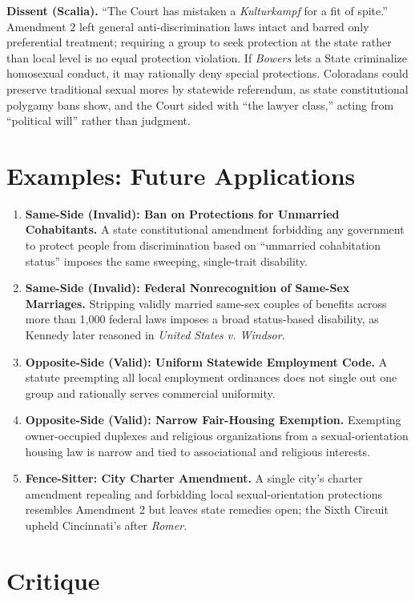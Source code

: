 \documentclass[12pt]{article}
\begin{document}
\textbf{Dissent (Scalia).} ``The Court has mistaken a \textit{Kulturkampf} for a fit of spite.'' Amendment 2 left general anti-discrimination laws intact and barred only preferential treatment; requiring a group to seek protection at the state rather than local level is no equal protection violation. If \textit{Bowers} lets a State criminalize homosexual conduct, it may rationally deny special protections. Coloradans could preserve traditional sexual mores by statewide referendum, as state constitutional polygamy bans show, and the Court sided with ``the lawyer class,'' acting from ``political will'' rather than judgment.

\section{Examples: Future Applications}

\begin{enumerate}
\item \textbf{Same-Side (Invalid): Ban on Protections for Unmarried Cohabitants.} A state constitutional amendment forbidding any government to protect people from discrimination based on ``unmarried cohabitation status'' imposes the same sweeping, single-trait disability.
\item \textbf{Same-Side (Invalid): Federal Nonrecognition of Same-Sex Marriages.} Stripping validly married same-sex couples of benefits across more than 1,000 federal laws imposes a broad status-based disability, as Kennedy later reasoned in \textit{United States v. Windsor}.
\item \textbf{Opposite-Side (Valid): Uniform Statewide Employment Code.} A statute preempting all local employment ordinances does not single out one group and rationally serves commercial uniformity.
\item \textbf{Opposite-Side (Valid): Narrow Fair-Housing Exemption.} Exempting owner-occupied duplexes and religious organizations from a sexual-orientation housing law is narrow and tied to associational and religious interests.
\item \textbf{Fence-Sitter: City Charter Amendment.} A single city's charter amendment repealing and forbidding local sexual-orientation protections resembles Amendment 2 but leaves state remedies open; the Sixth Circuit upheld Cincinnati's after \textit{Romer}.
\end{enumerate}

\section{Critique}
\end{document}
